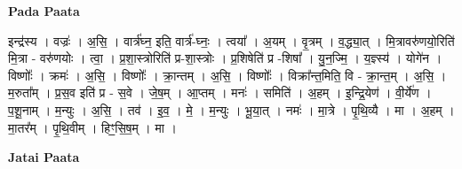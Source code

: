 \documentclass[17pt]{extarticle}
\begin{document}
\textbf{Pada Paata} \newline

इन्द्र॑स्य । वज्रः॑ । अ॒सि॒ । वार्त्र॑घ्न॒ इति॒ वार्त्र॑-घ्नः॒ । त्वया᳚ । अ॒यम् । वृ॒त्रम् । व॒द्ध्या॒त् । मि॒त्रावरु॑णयो॒रिति॑ मि॒त्रा - वरु॑णयोः । त्वा॒ । प्र॒शा॒स्त्रोरिति॑ प्र-शा॒स्त्रोः । प्र॒शिषेति॑ प्र -शिषा᳚ । यु॒न॒ज्मि॒ । य॒ज्ञ्स्य॑ । योगे॑न । विष्णोः᳚ । क्रमः॑ । अ॒सि॒ । विष्णोः᳚ । क्रा॒न्तम् । अ॒सि॒ । विष्णोः᳚ । विक्रा᳚न्त॒मिति॒ वि - क्रा॒न्त॒म् । अ॒सि॒ । म॒रुता᳚म् । प्र॒स॒व इति॑ प्र - स॒वे । जे॒ष॒म् । आ॒प्तम् । मनः॑ । समिति॑ । अ॒हम् । इ॒न्द्रि॒येण॑ । वी॒र्ये॑ण । प॒शू॒नाम् । म॒न्युः । अ॒सि॒ । तव॑ । इ॒व॒ । मे॒ । म॒न्युः । भू॒या॒त् । नमः॑ । मा॒त्रे । पृ॒थि॒व्यै । मा । अ॒हम् । मा॒तर᳚म् । पृ॒थि॒वीम् । हिꣳ॒॒सि॒ष॒म् । मा ।  \newline



\textbf{Jatai Paata} \newline
\end{document}
